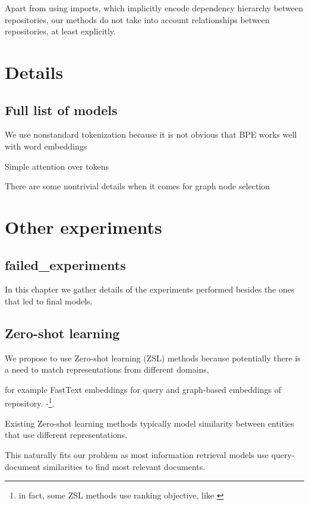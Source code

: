 \documentclass[longabstract,mgr,english]{iithesis}
\begin{document}
Apart from using imports, which implicitly encode dependency hierarchy between
repositories, our methods do not take into account relationships between
repositories, at least explicitly. 

\nocite{*}



\appendix

\chapter{Details}

\section{Full list of models}

We use nonstandard tokenization because it is not obvious that BPE works well with word embeddings

Simple attention over tokens

There are some nontrivial details when it comes for graph node selection

\chapter{Other experiments}
\section{failed_experiments}
In this chapter we gather details of the experiments performed besides the ones
that led to final models.

\section{Zero-shot learning}


We propose to use Zero-shot learning (ZSL) methods because potentially there is a need to match representations from different domains,


for example FastText embeddings for query and graph-based embeddings of repository.
-\footnote{in fact, some ZSL methods use ranking objective, like \cite{label_embedding}}. 

Existing Zero-shot learning methods typically model similarity between entities that use different representations.

This naturally fits our problem as most information retrieval models use
query-document similarities to find most relevant documents.
\end{document}
